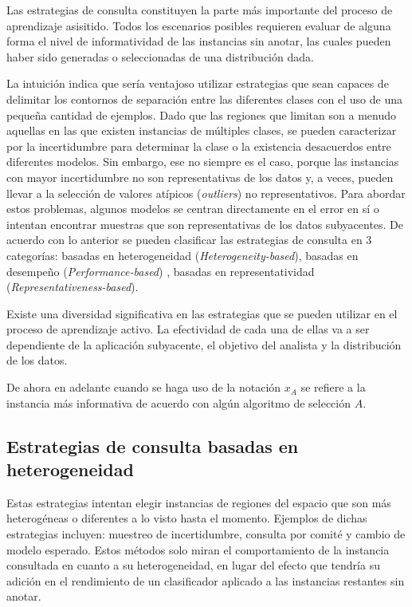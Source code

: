 Las estrategias de consulta constituyen la parte más importante del proceso de aprendizaje asisitido. Todos los escenarios posibles requieren evaluar de alguna forma el nivel de informatividad de las instancias sin anotar, las cuales pueden haber sido generadas o seleccionadas de una distribución dada.

La intuición indica que sería ventajoso utilizar estrategias que sean capaces de delimitar los contornos de separación entre las diferentes clases
con el uso de una pequeña cantidad de ejemplos. Dado que las regiones que limitan son a menudo aquellas en las que
existen instancias de múltiples clases, se pueden caracterizar por la incertidumbre para determinar la clase o la existencia desacuerdos entre diferentes modelos. Sin embargo, ese no siempre es el caso, porque las instancias con mayor incertidumbre no son representativas de los datos y, a veces, pueden llevar a la selección de valores atípicos (\textit{outliers}) no representativos. Para abordar estos problemas, algunos modelos se centran directamente en el error en sí o intentan encontrar muestras que son representativas de los datos subyacentes. De acuerdo con lo anterior se pueden clasificar las estrategias de consulta en 3 categorías: basadas en heterogeneidad (\textit{Heterogeneity-based}), basadas en desempeño (\textit{Performance-based}) , basadas en representatividad (\textit{Representativeness-based}).


Existe una diversidad significativa en las estrategias que se pueden utilizar en el proceso de aprendizaje activo. La efectividad de cada una de ellas va a ser dependiente de la
aplicación subyacente, el objetivo del analista y la distribución de los datos. 

De ahora en adelante cuando se haga uso de la notación $x_A$ se refiere a la instancia más informativa de acuerdo con algún algoritmo de selección $A$.


\subsection{Estrategias de consulta basadas en heterogeneidad}

Estas estrategias intentan elegir instancias de regiones del espacio que son más heterogéneas o diferentes a lo visto hasta el momento. Ejemplos de dichas estrategias incluyen: muestreo de incertidumbre, consulta por comité y cambio de modelo esperado. Estos métodos solo miran el comportamiento de la instancia consultada en cuanto a su heterogeneidad, en lugar del efecto que tendría su adición en el rendimiento de un clasificador aplicado a las instancias restantes sin anotar. 

